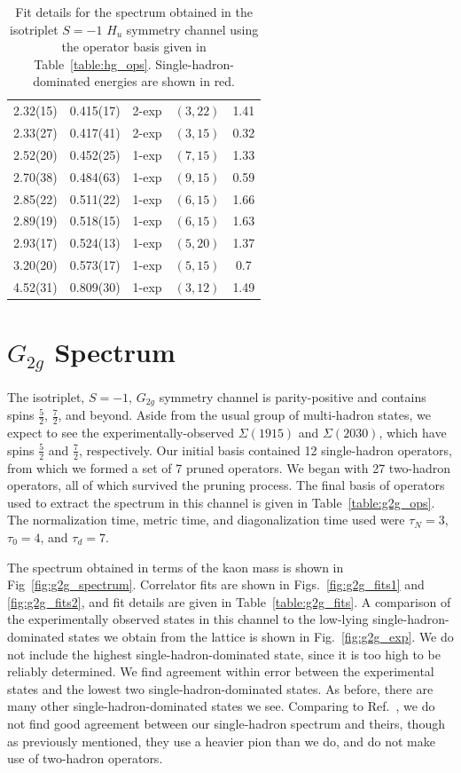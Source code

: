 \begin{table}[H]
\begin{tabu}{c|c|c|c|c}
        2.32(15)&0.415(17)&2{-}exp&$(3, 22)$&1.41 \\
        2.33(27)&0.417(41)&2{-}exp&$(3, 15)$&0.32 \\
        2.52(20)&0.452(25)&1{-}exp&$(7, 15)$&1.33 \\
        2.70(38)&0.484(63)&1{-}exp&$(9, 15)$&0.59 \\
        2.85(22)&0.511(22)&1{-}exp&$(6, 15)$&1.66 \\
        2.89(19)&0.518(15)&1{-}exp&$(6, 15)$&1.63 \\
        \rowfont{\color{red}}
        2.93(17)&0.524(13)&1{-}exp&$(5, 20)$&1.37 \\ 
        \rowfont{\color{red}}
        3.20(20)&0.573(17)&1{-}exp&$(5, 15)$&0.7 \\
        4.52(31)&0.809(30)&1{-}exp&$(3, 12)$&1.49
    \end{tabu}
    \caption[Fit details for the spectrum obtained in the isotriplet $S=-1$ $H_u$ symmetry channel using the operator basis given in Table~\ref{table:hg_ops}.]{Fit details for the spectrum obtained in the isotriplet $S=-1$ $H_u$ symmetry channel using the operator basis given in Table~\ref{table:hg_ops}. Single-hadron-dominated energies are shown in red.}\label{table:hu_fits}
\end{table}
\renewcommand{\arraystretch}{1.5}

\section{$G_{2g}$ Spectrum}
The isotriplet, $S=-1$, $G_{2g}$ symmetry channel is parity-positive and contains spins $\frac{5}{2}$, $\frac{7}{2}$, and beyond. Aside from the usual group of multi-hadron states, we expect to see the experimentally-observed $\Sigma(1915)$ and $\Sigma(2030)$, which have spins $\frac{5}{2}$ and $\frac{7}{2}$, respectively. Our initial basis contained 12 single-hadron operators, from which we formed a set of 7 pruned operators. We began with 27 two-hadron operators, all of which survived the pruning process. The final basis of operators used to extract the spectrum in this channel is given in Table~\ref{table:g2g_ops}. The normalization time, metric time, and diagonalization time used were $\tau_N=3$, $\tau_0=4$, and $\tau_d=7$.

The spectrum obtained in terms of the kaon mass is shown in Fig~\ref{fig:g2g_spectrum}. Correlator fits are shown in Figs.~\ref{fig:g2g_fits1} and \ref{fig:g2g_fits2}, and fit details are given in Table~\ref{table:g2g_fits}. A comparison of the experimentally observed states in this channel to the low-lying single-hadron-dominated states we obtain from the lattice is shown in Fig.~\ref{fig:g2g_exp}. We do not include the highest single-hadron-dominated state, since it is too high to be reliably determined. We find agreement within error between the experimental states and the lowest two single-hadron-dominated states. As before, there are many other single-hadron-dominated states we see. Comparing to Ref.~\cite{Edwards:2012fx}, we do not find good agreement between our single-hadron spectrum and theirs, though as previously mentioned, they use a heavier pion than we do, and do not make use of two-hadron operators.

